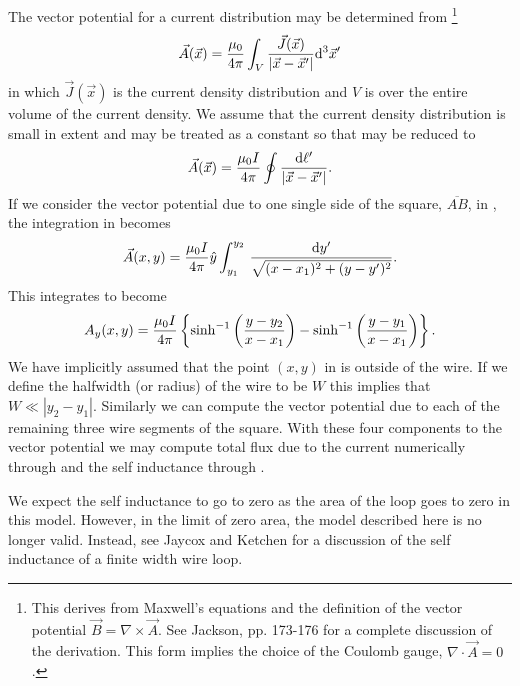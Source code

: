 The vector potential for a current distribution may be determined from%
\footnote{This derives from Maxwell's equations and the definition of the
vector potential $\vec{B}=
\nabla \times \vec{A}$. See Jackson\cite{jackson},
pp. 173-176 for a complete discussion of the derivation.
This form implies the choice of the Coulomb gauge, 
$\nabla \cdot \vec{A}=0$.}
%
\begin{equation}
\vec{A}(\vec{x}) = {\mu_0 \over 4\pi} \int_V {\vec{J}(\vec{x})\over
\left|\vec{x}-\vec{x}'\right|} \mathrm{d}^3 \vec{x}'
\label{eqn:vec_pot_a}
\end{equation}
%
in which $\vec{J}(\vec{x})$ is the current density distribution
and $V$ is over the entire volume of the current density.
We assume that the current density distribution is small in extent
and may be treated as a constant
so that  may be reduced to 
%
\begin{equation}
\vec{A}(\vec{x}) = {\mu_0 I  \over 4\pi}\oint {\ensuremath{\mathrm{d}}\ell'\over 
\left|\vec{x}-\vec{x}'\right|}.
\label{eqn:vec_pot_b}
\end{equation}
%
If we consider the vector potential due to one single side of the 
square, $\overline{AB}$, in , the
integration in  becomes
%
\begin{equation}
\vec{A}(x,y) = {\mu_0 I \over 4\pi} \hat{y} \int_{y_1}^{y_2}\,
{\mathrm{d} y' \over \sqrt{(x-x_1)^2+(y-y')^2}}.
\end{equation}
%
This integrates to become
%
\begin{equation}
A_y(x,y) = {\mu_0 I  \over 4\pi} \left\{\sinh^{-1}\left(\frac{y-y_2}{x-x_1}\right) - \sinh^{-1}\left(\frac{y-y_1}{x-x_1}\right)\right\}.
\label{eqn:vec_pot_sinh}
\end{equation}
We have implicitly assumed that the point $(x,y)$ in 
 is outside of the wire. If we define
the halfwidth (or radius) of the wire to be $W$ this implies that
$W\ll \left|y_2 - y_1\right|$.
Similarly we can compute the vector potential due to each of 
the remaining three wire segments of the square. With these
four components to the vector potential we may compute total flux 
due to the current numerically through  and
the self inductance through .

We expect the self inductance to go to zero as the area of the loop goes
to zero in this model. However, in the limit of zero area, the model
described here is no longer valid. Instead, see Jaycox and Ketchen
\cite{jaycox_ieeetm_mag17_400_1981} for a discussion of the 
self inductance of a finite width wire loop. 

